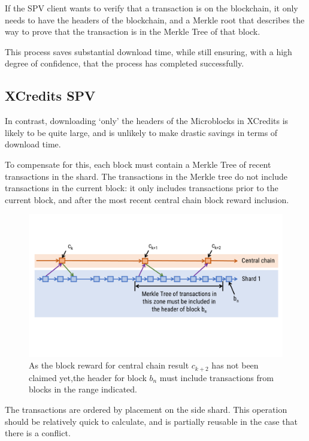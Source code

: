 \documentclass[a4paper,12pt]{article}
\begin{document}
If the SPV client wants to verify that a transaction is on the blockchain, it only needs to have the headers of the blockchain, and a Merkle root that describes the way to prove that the transaction is in the Merkle Tree of that block.

This process saves substantial download time, while still ensuring, with a high degree of confidence, that the process has completed successfully. 

\subsection{XCredits SPV}
In contrast, downloading `only' the headers of the Microblocks in XCredits is likely to be quite large, and is unlikely to make drastic savings in terms of download time. 


To compensate for this, each block must contain a Merkle Tree of recent transactions in the shard. The transactions in the Merkle tree do not include transactions in the current block: it only includes transactions prior to the current block, and after the most recent central chain block reward inclusion. 

\begin{figure}[!htb]
  \centering
  \includegraphics[page=1,width=.95\textwidth]{block-header-merkle-tree} 
  \caption{As the block reward for central chain result $c_{k+2}$ has not been claimed yet,the header for block $b_n$ must include transactions from blocks in the range indicated.}
  \label{fig:block-header-merkle-tree}
\end{figure}
\FloatBarrier


The transactions are ordered by placement on the side shard. This operation should be relatively quick to calculate, and is partially reusable in the case that there is a conflict.
\end{document}
